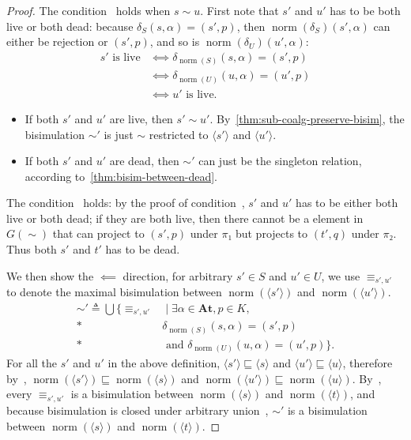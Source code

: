 \documentclass[conference]{IEEEtran}
\newcommand{\At}{\mathbf{At}}
\DeclareMathOperator{\norm}{\mathrm{norm}}
\begin{document}
\begin{proof}
    The condition~ holds when \(s ∼ u\).
    First note that \(s'\) and \(u'\) has to be both live or both dead: because \(δ_S(s, α) = (s', p)\), then \(\norm(δ_S)(s', α)\) can either be rejection or \((s',p)\), and so is \(\norm(δ_U)(u', α)\):
    \begin{align*}
        s' \text{ is live} 
        & ⟺ δ_{\norm(S)}(s, α) = (s', p) \\
        & ⟺ δ_{\norm(U)}(u, α) = (u', p) \\
        & ⟺ u' \text{ is live}.
    \end{align*}
    \begin{itemize}
        \item If both \(s'\) and \(u'\) are live, then \(s' ∼ u'\). By~\cref{thm:sub-coalg-preserve-bisim}, the bisimulation \(∼'\) is just \(∼\) restricted to \(⟨s'⟩\) and \(⟨u'⟩\).
        \item If both \(s'\) and \(u'\) are dead, then \(∼'\) can just be the singleton relation, according to~\cref{thm:bisim-between-dead}.
    \end{itemize}

    The condition~ holds: by the proof of condition~, \(s'\) and \(u'\) has to be either both live or both dead; if they are both live, then there cannot be a element in \(G(∼)\) that can project to \((s', p)\) under \(π₁\) but projects to \((t', q)\) under \(π₂\). Thus both \(s'\) and \(t'\) has to be dead.

    We then show the \(⟸\) direction, for arbitrary \(s' ∈ S\) and \(u' ∈ U\), we use \(≡_{s', u'}\) to denote the maximal bisimulation between \(\norm(⟨s'⟩)\) and \(\norm(⟨u'⟩)\).
    \begin{align*}
        {∼'} ≜ ⋃ \{≡_{s', u'} & ∣ ∃ α ∈ \At, p ∈ K, \\*
            & δ_{\norm(S)}(s, α) = (s', p) \\*
            & \text{ and } δ_{\norm(U)}(u, α) = (u', p)\}.
    \end{align*}
    For all the \(s'\) and \(u'\) in the above definition, \(⟨s'⟩ ⊑ ⟨s⟩\) and \(⟨u'⟩ ⊑ ⟨u⟩\), therefore by~, \(\norm(⟨s'⟩) ⊑ \norm(⟨s⟩)\) and \(\norm(⟨u'⟩) ⊑ \norm(⟨u⟩)\). 
    By~, every \(≡_{s', u'}\) is a bisimulation between \(\norm(⟨s⟩)\) and \(\norm(⟨t⟩)\), and because bisimulation is closed under arbitrary union~\cite{rutten_UniversalCoalgebraTheory_2000}, \(∼'\) is a bisimulation between \(\norm(⟨s⟩)\) and \(\norm(⟨t⟩)\).


\end{proof}
\end{document}
